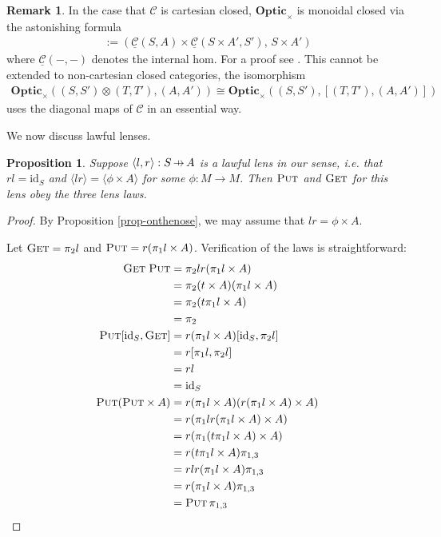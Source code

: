 \documentclass[11pt,a4paper]{article}
\theoremstyle{plain}
\newtheorem{proposition}[theorem]{Proposition}
\theoremstyle{definition}
\newtheorem{remark}[theorem]{Remark}
\newcommand{\C}{\mathscr{C}}
\newcommand{\homC}{\underline{\C}}
\newcommand{\Optic}{\mathbf{Optic}}
\newcommand{\id}{\mathrm{id}}
\newcommand{\fget}{\textsc{Get}}
\newcommand{\fput}{\textsc{Put}}
\newcommand{\hto}{\ensuremath{\,\mathaccent\shortmid\rightarrow\,}}
\begin{document}
\begin{remark}
In the case that $\C$ is cartesian closed, $\Optic_\times$ is monoidal closed via the astonishing formula
\begin{align*}
[(S, S'), (A, A')] := (\homC(S, A) \times \homC(S \times A', S'), \, S \times A')
\end{align*}
where $\homC(-, -)$ denotes the internal hom. For a proof see \cite[Section 1.2]{DialecticaCategories}. This cannot be extended to non-cartesian closed categories, the isomorphism 
\begin{align*}
\Optic_\times((S, S') \otimes (T, T'), (A, A')) \cong \Optic_\times((S, S'),  [(T, T'), (A, A')])
\end{align*}
uses the diagonal maps of $\C$ in an essential way.
\end{remark}

We now discuss lawful lenses.

\begin{proposition}
\label{prop-OpticImpliesLensLaws}
Suppose $\langle l, r \rangle : S \hto A$ is a lawful lens in our sense, i.e. that $rl = \id_S$ and $\langle lr \rangle = \langle \phi \times A \rangle$ for some $\phi : M \to M$. Then $\fput$ and $\fget$ for this lens obey the three lens laws.
\end{proposition}
\begin{proof}
By Proposition \ref{prop-onthenose}, we may assume that $lr = \phi \times A$.

Let $\fget = \pi_2 l$ and $\fput = r (\pi_1 l \times A)$. Verification of the laws is straightforward:
\begin{align*}
\fget \; \fput 
&= \pi_2 l r (\pi_1 l \times A) \\
&= \pi_2 (t \times A) (\pi_1 l \times A) \\
&= \pi_2 (t \pi_1 l \times A) \\
&= \pi_2 \\
\fput [\id_S, \fget] 
&= r (\pi_1 l \times A) [\id_S, \pi_2 l] \\
&= r [\pi_1 l, \pi_2 l] \\
&= rl \\
&= \id_S \\
\fput (\fput \times A) 
&= r (\pi_1 l \times A) (r (\pi_1 l \times A) \times A) \\
&= r (\pi_1 l  r (\pi_1 l \times A) \times A) \\
&= r (\pi_1 (t\pi_1 l \times A) \times A) \\
&= r (t\pi_1 l \times A) \pi_{1,3} \\
&= r lr(\pi_1 l \times A) \pi_{1,3} \\
&= r(\pi_1 l \times A) \pi_{1,3} \\
&= \fput \, \pi_{1, 3}
\end{align*}
\end{proof}
\end{document}
